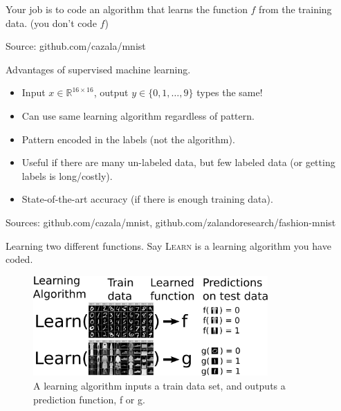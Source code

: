 \documentclass{article}
\newcommand{\RR}{\mathbb R}
\begin{document}
  Your job is to code an algorithm that learns the function $f$ from
  the training data. (you don't code $f$)
  
  Source: github.com/cazala/mnist

  Advantages of supervised machine learning.
  \begin{itemize}
  \item Input $x\in\RR^{16\times 16}$, output $y\in\{0,1,\dots,9\}$ types the same!
  \item Can use same learning algorithm regardless of pattern.
  \item Pattern encoded in the labels (not the algorithm).
  \item Useful if there are many un-labeled data, but few labeled data
    (or getting labels is long/costly).
  \item State-of-the-art accuracy (if there is enough training data).
  \end{itemize}
  Sources: github.com/cazala/mnist, github.com/zalandoresearch/fashion-mnist

Learning two different functions.
Say \textsc{Learn} is a learning algorithm you have coded.
\begin{figure}
  \centering
  \includegraphics[width=0.8\textwidth]{drawing-mnist-train-test.pdf}
  \caption{A learning algorithm inputs a train data set, and outputs a prediction function, f or g.}
  \label{fig:drawing-mnist-train-test}
\end{figure}
\end{document}
